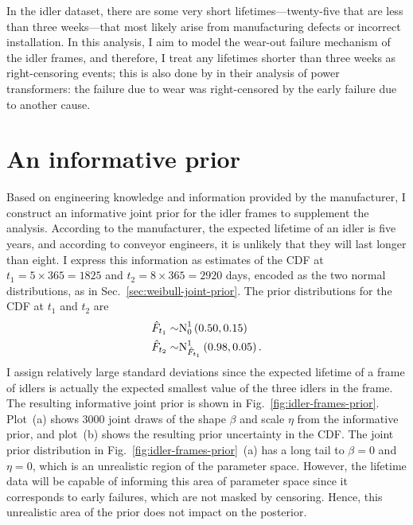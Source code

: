 In the idler dataset, there are some very short lifetimes---twenty-five that are less than three weeks---that most likely arise from manufacturing defects or incorrect installation. In this analysis, I aim to model the wear-out failure mechanism of the idler frames, and therefore, I treat any lifetimes shorter than three weeks as right-censoring events; this is also done by \citet{hong2009} in their analysis of power transformers: the failure due to wear was right-censored by the early failure due to another cause.

\section{An informative prior} \label{sec:idler-frame-joint-prior}

Based on engineering knowledge and information provided by the manufacturer, I construct an informative joint prior for the idler frames to supplement the analysis. According to the manufacturer, the expected lifetime of an idler is five years, and according to conveyor engineers, it is unlikely that they will last longer than eight. I express this information as estimates of the CDF at $t_1 = 5 \times 365 = 1825$ and $t_2 = 8 \times 365 = 2920$ days, encoded as the two normal distributions, as in Sec.~\ref{sec:weibull-joint-prior}. The prior distributions for the CDF at $t_1$ and $t_2$ are
\begin{align*}
  \hat{F}_{t_1} \sim & \hbox{N}^{1}_{0}\left(0.50, 0.15\right)    \\
  \hat{F}_{t_2} \sim & \hbox{N}^{1}_{\hat{F}_{t_1}}\left(0.98, 0.05\right).
\end{align*}
I assign relatively large standard deviations since the expected lifetime of a frame of idlers is actually the expected smallest value of the three idlers in the frame. The resulting informative joint prior is shown in Fig.~\ref{fig:idler-frames-prior}. Plot~(a) shows 3000 joint draws of the shape $\beta$ and scale $\eta$ from the informative prior, and plot~(b) shows the resulting prior uncertainty in the CDF. The joint prior distribution in Fig.~\ref{fig:idler-frames-prior}~(a) has a long tail to $\beta = 0$ and $\eta = 0$, which is an unrealistic region of the parameter space. However, the lifetime data will be capable of informing this area of parameter space since it corresponds to early failures, which are not masked by censoring. Hence, this unrealistic area of the prior does not impact on the posterior.

